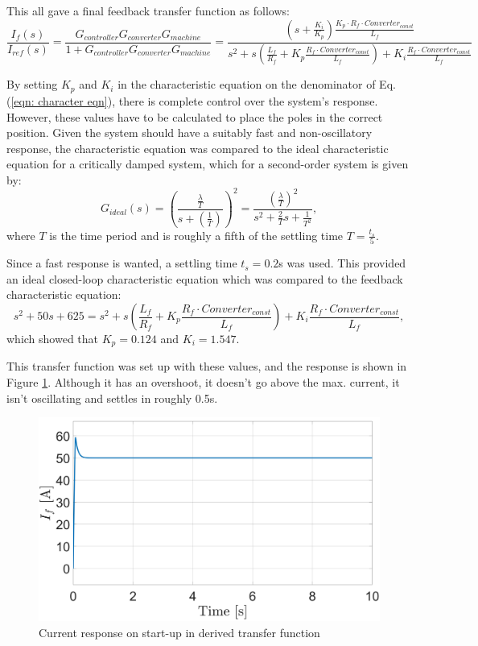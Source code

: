             This all gave a final feedback transfer function as follows:
            \begin{equation}
                \frac{I_f(s)}{I_{ref}(s)} = \frac{G_{controller}G_{converter}G_{machine}}{1+G_{controller}G_{converter}G_{machine}} = \frac{\left(s+\frac{K_i}{K_p}\right)\frac{K_p \cdot R_f \cdot Converter_{const}}{L_f}}{s^2+s\left(\frac{L_f}{R_f} + K_p\frac{R_f \cdot Converter_{const}}{L_f}\right) + K_i\frac{R_f \cdot Converter_{const}}{L_f}} \label{eqn: character eqn}
            \end{equation}

            By setting \(K_p\) and \(K_i\) in the characteristic equation on the denominator of Eq. (\ref{eqn: character eqn}), there is complete control over the system's response. However, these values have to be calculated to place the poles in the correct position. Given the system should have a suitably fast and non-oscillatory response, the characteristic equation was compared to the ideal characteristic equation for a critically damped system, which for a second-order system is given by:
            \begin{equation}
                G_{ideal}(s) = \left(\frac{\frac{\lambda}{T}}{s+\left(\frac{1}{T}\right)}\right)^2 = \frac{\left(\frac{\lambda}{T}\right)^2}{s^2+\frac{2}{T}s + \frac{1}{T^2}},
            \end{equation}
            where \(T\) is the time period and is roughly a fifth of the settling time \(T = \frac{t_s}{5}\).

            Since a fast response is wanted, a settling time \(t_s = 0.2\)s was used. This provided an ideal closed-loop characteristic equation which was compared to the feedback characteristic equation:
            \begin{equation}
                s^2 + 50s + 625 = s^2+s\left(\frac{L_f}{R_f} + K_p\frac{R_f \cdot Converter_{const}}{L_f}\right) + K_i\frac{R_f \cdot Converter_{const}}{L_f},
            \end{equation}
            which showed that \(K_p = 0.124\) and \(K_i = 1.547\).

            This transfer function was set up with these values, and the response is shown in Figure \ref{fig: current resp}. Although it has an overshoot, it doesn't go above the max. current, it isn't oscillating and settles in roughly 0.5s.
            \begin{figure}[tbh!]
            \centering
            \includegraphics[width=0.6\linewidth]{PEMDT Exam Report/img/current response.jpg}
            \caption{Current response on start-up in derived transfer function}
            \label{fig: current resp}
        \end{figure}

